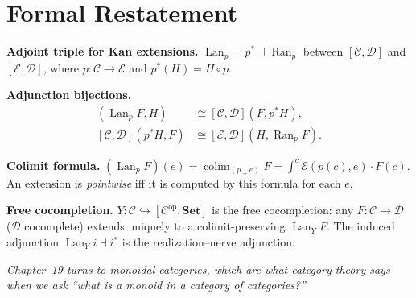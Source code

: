 \section*{Formal Restatement}

\begin{formalrestatement}
\textbf{Adjoint triple for Kan extensions.}
$\operatorname{Lan}_p \dashv p^* \dashv \operatorname{Ran}_p$ between
$[\mathcal{C},\mathcal{D}]$ and $[\mathcal{E},\mathcal{D}]$, where
$p : \mathcal{C} \to \mathcal{E}$ and $p^*(H) = H \circ p$.

\medskip
\textbf{Adjunction bijections.}
\begin{align*}
  [\mathcal{E},\mathcal{D}](\operatorname{Lan}_p F, H) &\cong
  [\mathcal{C},\mathcal{D}](F, p^* H), \\
  [\mathcal{C},\mathcal{D}](p^* H, F) &\cong
  [\mathcal{E},\mathcal{D}](H, \operatorname{Ran}_p F).
\end{align*}

\medskip
\textbf{Colimit formula.}
$(\operatorname{Lan}_p F)(e) = \operatorname{colim}_{(p \downarrow e)} F
= \int^c \mathcal{E}(p(c), e) \cdot F(c)$.
An extension is \emph{pointwise} iff it is computed by this formula for each $e$.

\medskip
\textbf{Free cocompletion.}
$Y : \mathcal{C} \hookrightarrow [\mathcal{C}^{\mathrm{op}}, \mathbf{Set}]$
is the free cocompletion: any $F : \mathcal{C} \to \mathcal{D}$ ($\mathcal{D}$
cocomplete) extends uniquely to a colimit-preserving $\operatorname{Lan}_Y F$.
The induced adjunction $\operatorname{Lan}_Y i \dashv i^*$ is the
realization--nerve adjunction.

\medskip
\noindent\textit{Chapter~19 turns to monoidal categories, which are what
category theory says when we ask ``what is a monoid in a category of
categories?''}
\end{formalrestatement}
